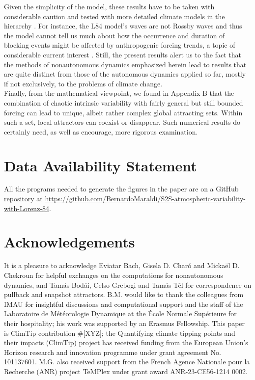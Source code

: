 \documentclass[%
 aip, cha,
 amsmath,amssymb,
 reprint,%
author-year,%
]{revtex4-1}
\newcommand{\0}{\mathbf 0}
\begin{document}
Given the simplicity of the model, these results have to be taken with considerable caution and tested with more detailed climate models in the hierarchy \citep{Ghil.2001, Held.2005}. For instance, the L84 model's waves are not Rossby waves and thus the model cannot tell us much about how the occurrence and duration of blocking events might be affected by anthropogenic forcing trends, a topic of considerable current interest \citep{ghil_S2S,Ghil.Lucar.2020, jetstream}. 
Still, the present results alert us to the fact that the methods of nonautonomous dynamics emphasized herein lead to results that are quite distinct from those of the autonomous dynamics applied so far, mostly if not exclusively, to the problems of climate change. \\
Finally, from the mathematical viewpoint, we found in Appendix B that the combination of chaotic intrinsic variability with fairly general but still bounded forcing can lead to unique, albeit rather complex global attracting sets. Within such a set, local attractors can coexist or disappear. Such numerical results do certainly need, as well as encourage, more rigorous examination. 



\section*{Data Availability Statement}
All the programs needed to generate the figures in the paper are on a GitHub repository at
\url{https://github.com/BernardoMaraldi/S2S-atmospheric-variability-with-Lorenz-84}.

\section*{Acknowledgements} It is a pleasure to acknowledge Eviatar Bach, Gisela D. Charó and Mickaël D. Chekroun  for helpful exchanges on the computations for nonautonomous dynamics, and Tamás Bodái, Celso Grebogi and Tamás Tél for correspondence on pullback and snapshot attractors.
B.M. would like to thank the colleagues from IMAU for insightful discussions and computational support and the staff of the Laboratoire de Météorologie Dynamique at the École Normale Supérieure for their hospitality; his work was supported by an Erasmus Fellowship. This paper is ClimTip contribution \#[XYZ]; the Quantifying climate tipping points and their impacts (ClimTip) project has received funding from the European Union’s Horizon research and innovation programme under grant agreement No. 101137601. M.G. also received support from the French Agence Nationale pour la Recherche (ANR) project TeMPlex under grant award ANR-23-CE56-1214 0002.
\end{document}

